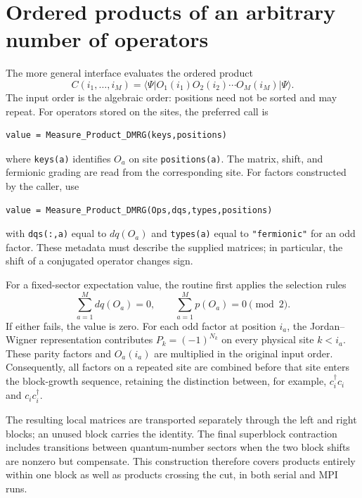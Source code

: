 \documentclass[11pt,a4paper]{article}
\newcommand{\ket}[1]{\lvert #1\rangle}
\newcommand{\bra}[1]{\langle #1\rvert}
\begin{document}
\section{Ordered products of an arbitrary number of operators}

The more general interface evaluates the ordered product
\begin{equation}
  C(i_1,\ldots,i_M)
  =\bra{\Psi}O_1(i_1)O_2(i_2)\cdots O_M(i_M)\ket{\Psi}.
\end{equation}
The input order is the algebraic order: positions need not be sorted and may
repeat.  For operators stored on the sites, the preferred call is
\begin{lstlisting}[style=fortran]
value = Measure_Product_DMRG(keys,positions)
\end{lstlisting}
where \texttt{keys(a)} identifies $O_a$ on site \texttt{positions(a)}.  The
matrix, shift, and fermionic grading are read from the corresponding site.
For factors constructed by the caller, use
\begin{lstlisting}[style=fortran]
value = Measure_Product_DMRG(Ops,dqs,types,positions)
\end{lstlisting}
with \texttt{dqs(:,a)} equal to $dq(O_a)$ and \texttt{types(a)} equal to
\texttt{"fermionic"} for an odd factor.  These metadata must describe the
supplied matrices; in particular, the shift of a conjugated operator changes
sign.

For a fixed-sector expectation value, the routine first applies the selection
rules
\begin{equation}
  \sum_{a=1}^{M}dq(O_a)=0,
  \qquad
  \sum_{a=1}^{M}p(O_a)=0\pmod 2.
\end{equation}
If either fails, the value is zero.  For each odd factor at position $i_a$,
the Jordan--Wigner representation contributes $P_k=(-1)^{N_k}$ on every
physical site $k<i_a$.  These parity factors and $O_a(i_a)$ are multiplied
in the original input order.  Consequently, all factors on a repeated site
are combined before that site enters the block-growth sequence, retaining
the distinction between, for example, $c_i^\dagger c_i$ and
$c_i c_i^\dagger$.

The resulting local matrices are transported separately through the left and
right blocks; an unused block carries the identity.  The final superblock
contraction includes transitions between quantum-number sectors when the
two block shifts are nonzero but compensate.  This construction therefore
covers products entirely within one block as well as products crossing the
cut, in both serial and MPI runs.
\end{document}

